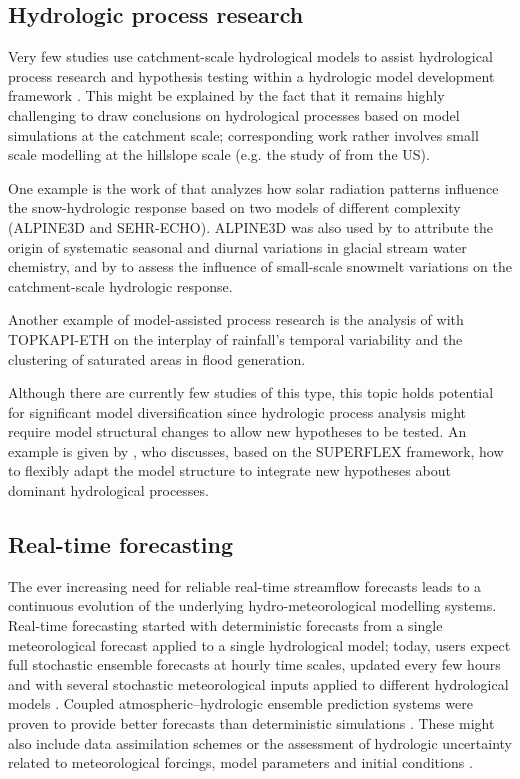 \documentclass[10pt,a4paper]{article}
\begin{document}
\subsection{Hydrologic process research}
\label{sec:application:process}

Very few studies use catchment-scale hydrological models to assist
hydrological process research and hypothesis testing within a hydrologic
model development framework \citep{clarkOpinion2016}. This might be explained
by the fact that it remains highly challenging to draw conclusions on
hydrological processes based on model simulations at the catchment
scale; corresponding work rather involves small scale modelling at the
hillslope scale (e.g. the study of \citealt{Heuvel2018} from the US). 

One example is the work of \citet{Comola2017} that analyzes how solar
radiation patterns influence the snow-hydrologic response based on two
models of different complexity (ALPINE3D and SEHR-ECHO). ALPINE3D was
also used by \citet{Hindshaw2011} to attribute the origin of systematic
seasonal and diurnal variations in glacial stream water chemistry, and
by \citet{Brauchli2017} to assess the influence of small-scale snowmelt
variations on the catchment-scale hydrologic response.

Another example of model-assisted process research is the analysis
of \citet{Paschalis_2014} with TOPKAPI-ETH on the interplay of rainfall's
temporal variability and the clustering of saturated areas in flood
generation.

Although there are currently few studies of this type, this topic holds
potential for significant model diversification since hydrologic process
analysis might require model structural changes to allow new hypotheses
to be tested. An example is given by \citet{DalMolin2020}, who discusses,
based on the SUPERFLEX framework, how to flexibly adapt the model
structure to integrate new hypotheses about dominant hydrological
processes.

\subsection{Real-time forecasting}
\label{sec:application:forecasting}

The ever increasing need for reliable real-time streamflow forecasts
leads to a continuous evolution of the underlying hydro-meteorological
modelling systems. Real-time forecasting started with deterministic
forecasts from a single meteorological forecast applied to a single
hydrological model; today, users expect full stochastic ensemble
forecasts at hourly time scales, updated every few hours and with
several stochastic meteorological inputs applied to different
hydrological models \citep{Karsten2016}. Coupled atmospheric--hydrologic
ensemble prediction systems were proven to provide better forecasts
than deterministic simulations \citep{Verbunt2007,Zappa2008,Jaun2008a,Liechti2013}. These might also
include data assimilation schemes \citep{J_rg_Hess_2015} or the assessment
of hydrologic uncertainty related to meteorological forcings, model
parameters and initial conditions \citep{Zappa2011a,Fundel2011}.
\end{document}
